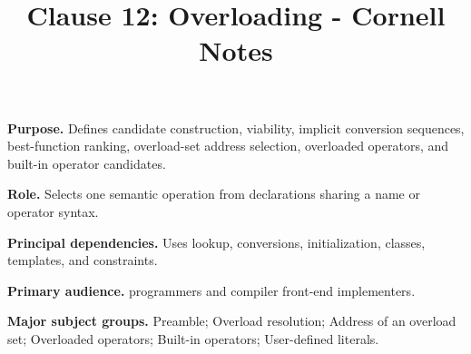 \documentclass[11pt,letterpaper]{article}
\title{Clause 12: Overloading - Cornell Notes}
\author{}
\date{}
\begin{document}
\maketitle
\begin{CornellReferenceOrientationBox}
\textbf{Purpose.} Defines candidate construction, viability, implicit conversion sequences, best-function ranking, overload-set address selection, overloaded operators, and built-in operator candidates.
\par\textbf{Role.} Selects one semantic operation from declarations sharing a name or operator syntax.
\par\textbf{Principal dependencies.} Uses lookup, conversions, initialization, classes, templates, and constraints.
\par\textbf{Primary audience.} programmers and compiler front-end implementers.
\par\textbf{Major subject groups.} Preamble; Overload resolution; Address of an overload set; Overloaded operators; Built-in operators; User-defined literals.
\end{CornellReferenceOrientationBox}
\end{document}
